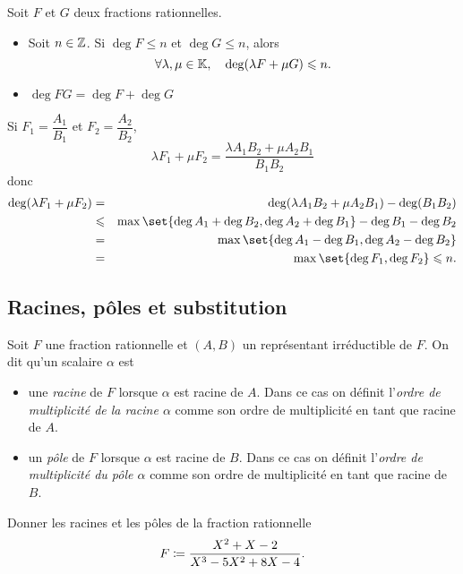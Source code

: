 \documentclass{magnolia}
\begin{document}
\begin{proposition}
Soit $F$ et $G$ deux fractions rationnelles.
\begin{itemize}
\item Soit $n\in\mathbb{Z}$. Si $\deg F\leq n$ et $\deg G\leq n$, alors
  \[\forall \lambda,\mu\in\mathbb{K} ,\quad \deg(\lambda F+\mu G) \leqslant n.\]
\item $\deg F G = \deg F + \deg G$
\end{itemize}
\end{proposition}

\begin{preuve}
Si $F_1=\dfrac{A_1}{B_1}$ et $F_2=\dfrac{A_2}{B_2}$, $$\lambda F_1+\mu F_2=\frac{\lambda A_1B_2+\mu A_2B_1}{B_1B_2}$$ donc 
\begin{eqnarray*}
\deg(\lambda F_1+\mu F_2)&=&\deg(\lambda A_1B_2+\mu A_2B_1)-\deg(B_1B_2)\\
&\leq& \max{\set{\deg A_1+\deg B_2,\deg A_2+\deg B_1}}-\deg B_1-\deg B_2\\
&=&\max{\set{\deg A_1-\deg B_1,\deg A_2-\deg B_2}}\\
&=&\max{\set{\deg F_1,\deg F_2}}\leq n.
\end{eqnarray*}
\end{preuve}

\subsection{Racines, pôles et substitution}
\begin{definition}
Soit $F$ une fraction rationnelle et $(A,B)$ un représentant irréductible de
$F$. On dit qu'un scalaire $\alpha$ est
\begin{itemize}
\item une \emph{racine} de $F$ lorsque $\alpha$ est racine de $A$. Dans ce cas
  on définit l'\emph{ordre de multiplicité de la racine $\alpha$} comme
  son ordre de multiplicité en tant que racine de $A$. 
\item un \emph{pôle} de $F$ lorsque $\alpha$ est racine de $B$. Dans ce cas
  on définit l'\emph{ordre de multiplicité du pôle $\alpha$} comme
  son ordre de multiplicité en tant que racine de $B$. 
\end{itemize}
\end{definition}

\begin{exoUnique}
\exo Donner les racines et les pôles de la fraction rationnelle
  \[F\coloneqq\frac{X^2+X-2}{X^3-5X^2+8X-4}.\]
\end{exoUnique}
\end{document}
